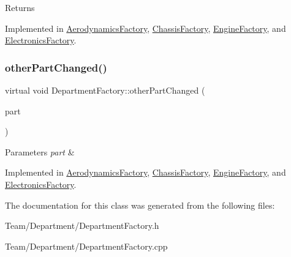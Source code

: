 \begin{DoxyReturn}{Returns}

\end{DoxyReturn}


Implemented in \hyperlink{classAerodynamicsFactory_a3b0af6c00d4a8549164b3d5ec9a1f256}{Aerodynamics\+Factory}, \hyperlink{classChassisFactory_af038789501da489aeccb19520dc09686}{Chassis\+Factory}, \hyperlink{classEngineFactory_a52fd49ea32ab2dc62aa8c86e058fb138}{Engine\+Factory}, and \hyperlink{classElectronicsFactory_a494fea1f1a55bca20ce1bb4c988d9d44}{Electronics\+Factory}.

\mbox{\label{classDepartmentFactory_a41e5c96ee84f8237cb08d31cd782efae}} 
\subsubsection{\texorpdfstring{other\+Part\+Changed()}{otherPartChanged()}}
{\footnotesize\ttfamily virtual void Department\+Factory\+::other\+Part\+Changed (\begin{DoxyParamCaption}\item[{\hyperlink{classDepartmentOutput}{Department\+Output} $\ast$}]{part }\end{DoxyParamCaption})\hspace{0.3cm}{\ttfamily [pure virtual]}}


\begin{DoxyParams}{Parameters}
{\em part} & \\
\hline
\end{DoxyParams}


Implemented in \hyperlink{classAerodynamicsFactory_a873e60729f4e8a74608fbf29322cf2f6}{Aerodynamics\+Factory}, \hyperlink{classChassisFactory_a15eb17dfcb995b9dcc75d4908e49a17f}{Chassis\+Factory}, \hyperlink{classEngineFactory_a12c1223834cb2d653a1c659aa1504c51}{Engine\+Factory}, and \hyperlink{classElectronicsFactory_ae21ff30f4890eab2474fac71d2615941}{Electronics\+Factory}.



The documentation for this class was generated from the following files\+:\begin{DoxyCompactItemize}
\item 
Team/\+Department/Department\+Factory.\+h\item 
Team/\+Department/Department\+Factory.\+cpp\end{DoxyCompactItemize}
